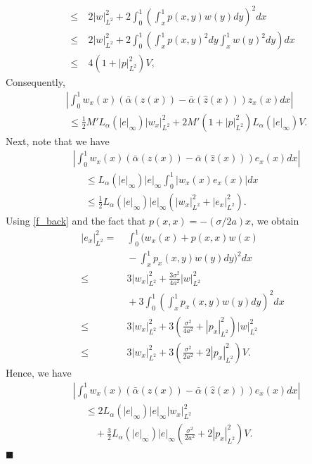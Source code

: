 \documentclass[twocolumn]{autart}
\newenvironment{proof}{{\it Proof. }}{\hfill $\blacksquare$ }
\begin{document}
\begin{proof}
\begin{align}
\end{align}
\begin{align}
\leq&~ 2|w|_{L^2}^2+2\int_{0}^{1}\left(\int_x^1 p(x,y)w(y)dy\right)^2dx \nonumber\\
\leq&~ 2|w|_{L^2}^2 + 2\int_{0}^{1}\left(\int_{x}^{1}p(x,y)^2dy \int_{x}^{1}w(y)^2dy\right) dx \nonumber\\
\leq&~ 4\left(1+|p|_{L^2}^2\right)V, \label{v_L2}
\end{align}
Consequently, 
\begin{align}
&\left|\int_{0}^{1}w_x(x)\left(\bar{\alpha}(z(x))-\bar{\alpha}(\hat{z}(x))\right)z_x(x)dx\right|\nonumber\\
&~\leq \frac{1}{2}M'L_{\alpha}(|e|_{\infty})|w_x|_{L^2}^2  + 2M'\left(1+|p|_{L^2}^2\right)L_{\alpha}(|e|_{\infty})V.\label{first_2}
\end{align}
Next, note that we have 
\begin{align*}
&\left|\int_{0}^{1}w_x(x)\left(\bar{\alpha}(z(x))-\bar{\alpha}(\hat{z}(x))\right)e_x(x)dx\right| \\
&~\quad \leq L_{\alpha}(|e|_{\infty})|e|_{\infty}\int_{0}^{1}|w_x(x)e_x(x)|dx \\
&~\quad \leq \frac{1}{2}L_{\alpha}(|e|_{\infty})|e|_{\infty}\left(|w_x|_{L^2}^2+|e_x|_{L^2}^2\right).
\end{align*}
Using \eqref{f_back} and the fact that $p(x,x)=-(\sigma/2a)x$, we obtain
\begin{align}
|e_x|_{L^2}^2 =&~ \int_{0}^{1}\bigg(w_x(x) +p(x,x)w(x) \nonumber \\
&~-\int_{x}^1p_x(x,y)w(y)dy\bigg)^2dx\nonumber\\
\leq&~ 3|w_x|_{L^2}^2+\frac{3\sigma^2}{4a^2}|w|_{L^2}^2 \nonumber\\
&~+3\int_{0}^{1}\left(\int_{x}^1p_x(x,y)w(y)dy\right)^2dx \nonumber \\
\leq&~3|w_x|_{L^2}^2+3\left(\frac{\sigma^2}{4a^2}+|p_x|_{L^2}^2\right)|w|_{L^2}^2 \nonumber\\
\leq&~3|w_x|_{L^2}^2+3\left(\frac{\sigma^2}{2a^2}+2|p_x|_{L^2}^2\right)V.\label{vx_L2_B}
\end{align}
Hence, we have 
\begin{align}
&\left|\int_{0}^{1}w_x(x)\left(\bar{\alpha}(z(x))-\bar{\alpha}(\hat{z}(x))\right)e_x(x)dx\right| \nonumber\\
&~\quad \leq 2L_{\alpha}(|e|_{\infty})|e|_{\infty}|w_x|_{L^2}^2 \nonumber\\
&~\quad \quad + \frac{3}{2}L_{\alpha}(|e|_{\infty})|e|_{\infty}\left(\frac{\sigma^2}{2a^2}+2|p_x|_{L^2}^2\right)V.\label{first_3}

\end{align}
\end{proof}
\end{document}
